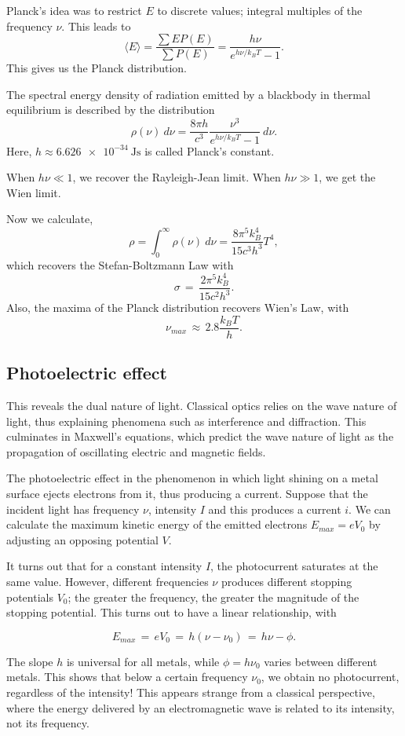 \documentclass[11pt]{article}
\newcommand\E[1]{\langle #1 \rangle}
\theoremstyle{definition}
\newenvironment{boxedeq}%
    {\begin{equationbox}\begin{equation}}%
    {\end{equation}\end{equationbox}}
\theoremstyle{remark}
\numberwithin{equation}{section}
\begin{document}
    Planck's idea was to restrict $E$ to discrete values; integral multiples of the
    frequency $\nu$. This leads to \[
        \E{E} = \frac{\sum E P(E)}{\sum P(E)} 
            = \frac{h\nu}{e^{h\nu /k_B T} - 1}.
    \] 
    This gives us the Planck distribution.

    \begin{theorem}
        The spectral energy density of radiation emitted by a blackbody in thermal
        equilibrium is described by the distribution \[
            \rho(\nu)\:d\nu 
                = \frac{8\pi h}{c^3} \frac{\nu^3}{e^{h\nu /k_B T} - 1} \:d\nu.
        \] 
        Here, $h \approx \SI{6.626e-34}{\joule\second}$ is called Planck's constant.
    \end{theorem}
    When $h\nu \ll 1$, we recover the Rayleigh-Jean limit. When $h\nu \gg 1$, we get
    the Wien limit.

    Now we calculate, \[
        \rho = \int_0^\infty \rho(\nu)\:d\nu = \frac{8\pi^5k_B^4}{15c^3h^3}T^4,
    \] which recovers the Stefan-Boltzmann Law with \[
        \sigma \,=\, \frac{2\pi^5k_B^4}{15c^2h^3}.
    \] 
    Also, the maxima of the Planck distribution recovers Wien's Law, with \[
        \nu_{max} \,\approx\, 2.8 \frac{k_B T}{h}.
    \] 

    \subsection{Photoelectric effect}
    This reveals the dual nature of light. Classical optics relies on the wave
    nature of light, thus explaining phenomena such as interference and diffraction.
    This culminates in Maxwell's equations, which predict the wave nature of light
    as the propagation of oscillating electric and magnetic fields.

    The photoelectric effect in the phenomenon in which light shining on a metal
    surface ejects electrons from it, thus producing a current. Suppose that the
    incident light has frequency $\nu$, intensity $I$ and this produces a current
    $i$. We can calculate the maximum kinetic energy of the emitted electrons
    $E_{max} = eV_0$ by adjusting an opposing potential $V$.

    It turns out that for a constant intensity $I$, the photocurrent saturates at
    the same value. However, different frequencies $\nu$ produces different stopping
    potentials $V_0$; the greater the frequency, the greater the magnitude of the
    stopping potential. This turns out to have a linear relationship, with
    \begin{boxedeq}
        E_{max} \,=\, eV_0 \,=\, h(\nu - \nu_0) \,=\, h\nu - \phi.
    \end{boxedeq}
    The slope $h$ is universal for all metals, while $\phi = h\nu_0$ varies
    between different metals.
    This shows that below a certain frequency $\nu_0$, we obtain no photocurrent,
    regardless of the intensity! This appears strange from a classical perspective,
    where the energy delivered by an electromagnetic wave is related to its
    intensity, not its frequency.
\end{document}
